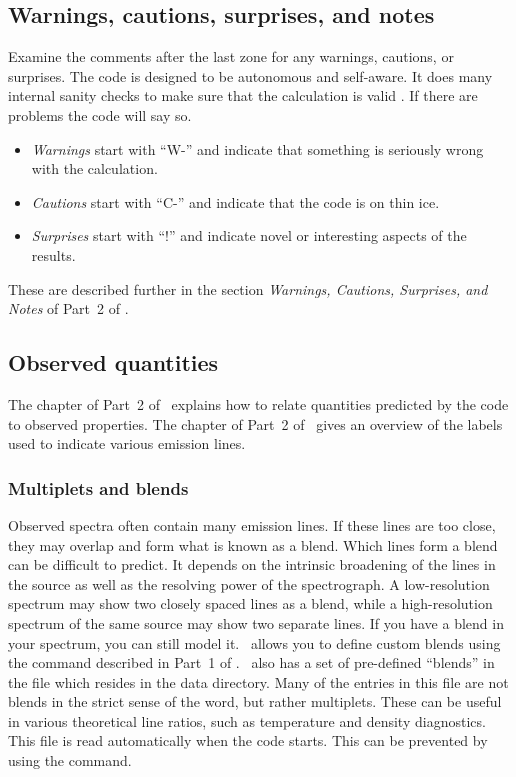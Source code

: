\documentclass[12pt,twoside]{article}
\begin{document}
{\subsection{Warnings, cautions, surprises, and notes}
\label{sec:WarningsCautionsSurprisesNotes}

Examine the comments after the last zone for any warnings, cautions,
or surprises.
The code is designed to be autonomous and self-aware.  It
does many internal sanity checks to make sure that the calculation is valid
\citep{FerlandReliability01}.
If there are problems the code will say so.

\begin{itemize}

\item \emph{Warnings} start
with ``W-'' and indicate that something is seriously wrong with the
calculation.

\item \emph{Cautions} start with
``C-'' and indicate that the code is on
thin ice.

\item \emph{Surprises} start with ``!'' and indicate novel or interesting
aspects of the results.
\end{itemize}

These are described further in the section
\emph{Warnings, Cautions, Surprises, and Notes} of Part~2 of \Hazy.

\subsection{Observed quantities}

The chapter  of
Part~2 of \Hazy\ explains how to relate
quantities predicted by the code to observed properties.
The chapter  of Part~2 of \Hazy\ gives an overview of the labels used to
indicate various emission lines.

\subsubsection{Multiplets and blends}

Observed spectra often contain many emission lines. If these lines are too
close, they may overlap and form what is known as a blend. Which lines form a
blend can be difficult to predict. It depends on the intrinsic broadening of
the lines in the source as well as the resolving power of the spectrograph. A
low-resolution spectrum may show two closely spaced lines as a blend, while a
high-resolution spectrum of the same source may show two separate lines. If
you have a blend in your spectrum, you can still model it. \Cloudy\ allows you
to define custom blends using the  command described in
Part~1 of \Hazy. \Cloudy\ also has a set of pre-defined ``blends'' in the file
 which resides in the data directory. Many of the
entries in this file are not blends in the strict sense of the word, but
rather multiplets. These can be useful in various theoretical line ratios, such
as temperature and density diagnostics. This file is read automatically when
the code starts. This can be prevented by using the 
command.

}
\end{document}
